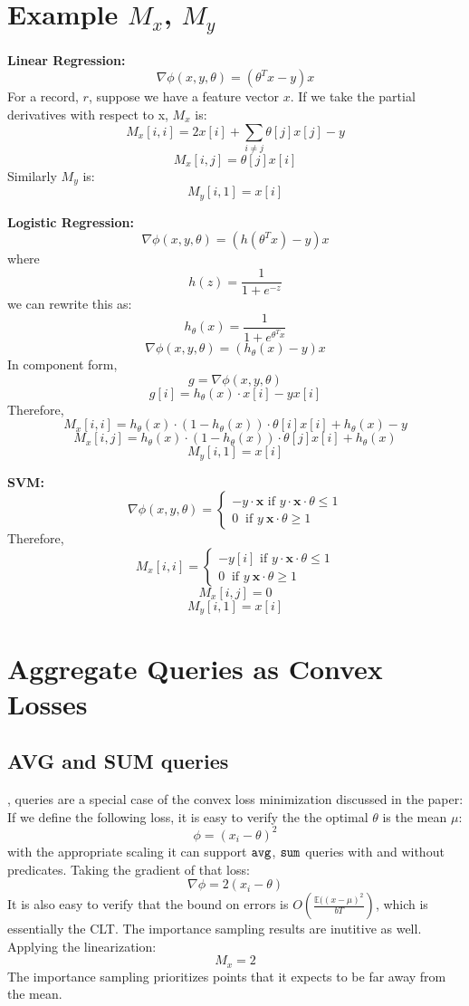 \section{Example $M_x$, $M_y$}\label{example-deriv}
\noindent\textbf{Linear Regression: }
\[
\nabla\phi(x,y,\theta) = (\theta^Tx - y)x
\]
For a record, $r$, suppose we have a feature vector $x$.
If we take the partial derivatives with respect to x, $M_x$ is:
\[
M_x[i,i] = 2x[i] + \sum_{i \ne j} \theta[j]x[j] - y 
\]
\[
M_x[i,j] = \theta[j]x[i]
\]
Similarly $M_y$ is:
\[
M_y[i,1] = x[i] 
\]

\vspace{0.5em}

\noindent\textbf{Logistic Regression: } 
\[
\nabla\phi(x,y,\theta) = (h(\theta^Tx) - y)x
\]
where
\[
h(z) = \frac{1}{1+e^{-z}}
\]
we can rewrite this as:
\[
h_{\theta}(x) = \frac{1}{1+e^{\theta^Tx}}
\]
\[
\nabla\phi(x,y,\theta) = (h_{\theta}(x) - y)x
\]
In component form,
\[
g = \nabla\phi(x,y,\theta)
\]
\[
g[i] = h_{\theta}(x)\cdot x[i] - yx[i]
\]
Therefore,
\[
M_x[i,i] = h_{\theta}(x)\cdot(1- h_{\theta}(x))\cdot \theta[i] x[i] + h_{\theta}(x) - y
\]
\[
M_x[i,j] = h_{\theta}(x)\cdot(1- h_{\theta}(x))\cdot \theta[j] x[i] + h_{\theta}(x)
\]
\[
M_y[i,1] = x[i] 
\]

\noindent\textbf{SVM: } 
\[
\nabla\phi(x,y,\theta) =
\begin{cases}      
-y\cdot\boldsymbol{x} \text{ if } y\cdot\boldsymbol{x}\cdot\theta \le 1 \\
0\ \text{ if } y\ \boldsymbol{x}\cdot\theta \geq 1      
\end{cases}
\]
Therefore,
\[
M_x[i,i] = \begin{cases}      
-y[i] \text{ if } y\cdot\boldsymbol{x}\cdot\theta \le 1 \\
0\ \text{ if } y\ \boldsymbol{x}\cdot\theta \geq 1      
\end{cases} 
\]
\[
M_x[i,j] = 0
\]
\[
M_y[i,1] = x[i] 
\]

\section{Aggregate Queries as Convex Losses}
\subsection{AVG and SUM queries}
\avgfunc, \sumfunc queries are a special case of the convex loss minimization discussed in the paper:
If we define the following loss, it is easy to verify the the optimal $\theta$ is the mean $\mu$:
\[
\phi = (x_{i} - \theta)^2
\]
with the appropriate scaling it can support $\texttt{avg} $, $\texttt{sum} $ queries with and without predicates.
Taking the gradient of that loss:
\[
\nabla\phi = 2(x_{i} - \theta)
\]
It is also easy to verify that the bound on errors is $O(\frac{\mathbb{E}((x-\mu)^2}{bT})$, which is essentially the CLT.
The importance sampling results are inutitive as well.
Applying the linearization:
\[
M_x = 2
\]
The importance sampling prioritizes points that it expects to be far away from the mean.


